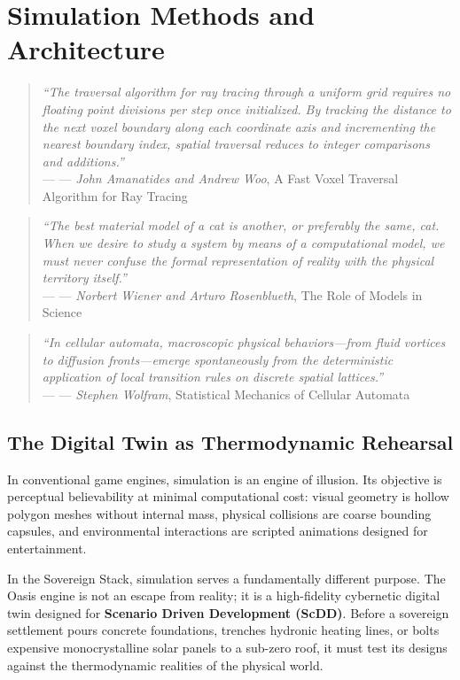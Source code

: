 \chapter{Simulation Methods and Architecture}
\label{chap:simulation_methods}

\providecommand{\epigraph}[2]{%
  \begin{quote}
    \textit{#1} \\
    \raggedleft--- #2
  \end{quote}
}

\epigraph{
    ``The traversal algorithm for ray tracing through a uniform grid requires no floating point divisions per step once initialized. By tracking the distance to the next voxel boundary along each coordinate axis and incrementing the nearest boundary index, spatial traversal reduces to integer comparisons and additions.''
}{--- \textit{John Amanatides and Andrew Woo}, \textnormal{A Fast Voxel Traversal Algorithm for Ray Tracing} \cite{amanatides1987fast}}

\epigraph{
    ``The best material model of a cat is another, or preferably the same, cat. When we desire to study a system by means of a computational model, we must never confuse the formal representation of reality with the physical territory itself.''
}{--- \textit{Norbert Wiener and Arturo Rosenblueth}, \textnormal{The Role of Models in Science} \cite{wiener1945role}}

\epigraph{
    ``In cellular automata, macroscopic physical behaviors---from fluid vortices to diffusion fronts---emerge spontaneously from the deterministic application of local transition rules on discrete spatial lattices.''
}{--- \textit{Stephen Wolfram}, \textnormal{Statistical Mechanics of Cellular Automata} \cite{wolfram1983statistical}}

\section{The Digital Twin as Thermodynamic Rehearsal}

In conventional game engines, simulation is an engine of illusion. Its objective is perceptual believability at minimal computational cost: visual geometry is hollow polygon meshes without internal mass, physical collisions are coarse bounding capsules, and environmental interactions are scripted animations designed for entertainment.

In the Sovereign Stack, simulation serves a fundamentally different purpose. The Oasis engine is not an escape from reality; it is a high-fidelity cybernetic digital twin designed for \textbf{Scenario Driven Development (ScDD)}. Before a sovereign settlement pours concrete foundations, trenches hydronic heating lines, or bolts expensive monocrystalline solar panels to a sub-zero roof, it must test its designs against the thermodynamic realities of the physical world. 

